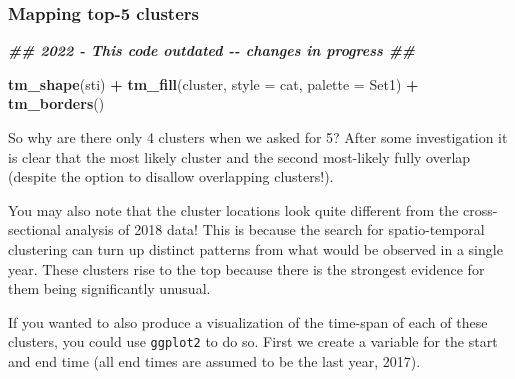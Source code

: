 \documentclass[
]{book}
\newenvironment{Shaded}{\begin{snugshade}}{\end{snugshade}}
\newcommand{\AttributeTok}[1]{\textcolor[rgb]{0.13,0.29,0.53}{#1}}
\newcommand{\DocumentationTok}[1]{\textcolor[rgb]{0.56,0.35,0.01}{\textbf{\textit{#1}}}}
\newcommand{\FunctionTok}[1]{\textcolor[rgb]{0.13,0.29,0.53}{\textbf{#1}}}
\newcommand{\NormalTok}[1]{#1}
\newcommand{\SpecialCharTok}[1]{\textcolor[rgb]{0.81,0.36,0.00}{\textbf{#1}}}
\newcommand{\StringTok}[1]{\textcolor[rgb]{0.31,0.60,0.02}{#1}}
\begin{document}
\hypertarget{mapping-top-5-clusters}{%
\subsubsection{Mapping top-5 clusters}\label{mapping-top-5-clusters}}

\begin{Shaded}
\begin{Highlighting}[]
\DocumentationTok{\#\# 2022 {-} This code outdated {-}{-} changes in progress \#\#}

\FunctionTok{tm\_shape}\NormalTok{(sti) }\SpecialCharTok{+} 
  \FunctionTok{tm\_fill}\NormalTok{(}\StringTok{\textquotesingle{}cluster\textquotesingle{}}\NormalTok{,}
          \AttributeTok{style =} \StringTok{\textquotesingle{}cat\textquotesingle{}}\NormalTok{,}
          \AttributeTok{palette =} \StringTok{\textquotesingle{}Set1\textquotesingle{}}\NormalTok{) }\SpecialCharTok{+}
  \FunctionTok{tm\_borders}\NormalTok{()}
\end{Highlighting}
\end{Shaded}

So why are there only 4 clusters when we asked for 5? After some investigation it is clear that the most likely cluster and the second most-likely fully overlap (despite the option to disallow overlapping clusters!).

You may also note that the cluster locations look quite different from the cross-sectional analysis of 2018 data! This is because the search for spatio-temporal clustering can turn up distinct patterns from what would be observed in a single year. These clusters rise to the top because there is the strongest evidence for them being significantly unusual.

If you wanted to also produce a visualization of the time-span of each of these clusters, you could use \texttt{ggplot2} to do so. First we create a variable for the start and end time (all end times are assumed to be the last year, 2017).
\end{document}
